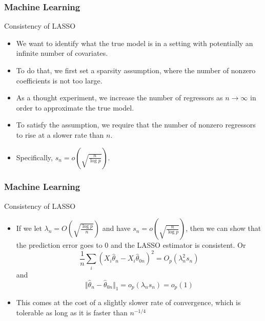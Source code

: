 \documentclass{beamer}
\begin{document}
\begin{frame}
\frametitle{Machine Learning}
Consistency of LASSO
\begin{itemize}
\item We want to identify what the true model is in a setting with potentially an infinite number of covariates. 
\item To do that, we first set a sparsity assumption, where the number of nonzero coefficients is not too large.
\item As a thought experiment, we increase the number of regressors as $n\to\infty$ in order to approximate the true model.
\item To satisfy the assumption, we require that the number of nonzero regressors to rise at a slower rate than $n$.
\item Specifically, $s_n = o\left(\sqrt{\frac{n}{\log p}}\right)$.
\end{itemize}
\end{frame}

\begin{frame}
\frametitle{Machine Learning}
Consistency of LASSO
\begin{itemize}
\item If we let $\lambda_n = O\left(\sqrt{\frac{\log p}{n}}\right)$ and have $s_n=o\left(\sqrt{\frac{n}{\log p}}\right)$, then we can show that the prediction error goes to 0 and the LASSO estimator is consistent. Or
\[
\frac{1}{n}\sum_i(X_i\hat{\theta}_n-X_i\hat{\theta}_{0n})^2=O_p(\lambda_n^2s_n)
\]
and 
\[
\Vert \hat{\theta}_n-\hat{\theta}_{0n}\Vert_1 = o_p(\lambda_n s_n) = o_p(1)
\]
\item This comes at the cost of a slightly slower rate of convergence, which is tolerable as long as it is faster than $n^{-1/4}$
\end{itemize}
\end{frame}
\end{document}
